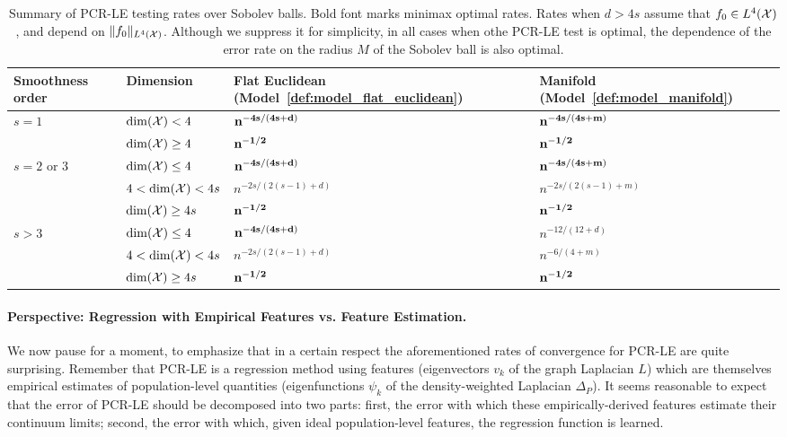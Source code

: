 \begin{table}
	\begin{center}
		\begin{tabular}{p{} p{} | p{} p{} }
			Smoothness order & Dimension & Flat Euclidean (Model~\ref{def:model_flat_euclidean}) & Manifold (Model~\ref{def:model_manifold}) \\
			\hline
			\multirow{2}{*}{$s = 1$} & $\dim(\mathcal{X}) < 4$ & ${\bf n^{-4s/(4s + d)}}$ & ${\bf n^{-4s/(4s + m)}}$ \\
			& $\dim(\mathcal{X}) \geq 4$ & ${\bf n^{-1/2}}$ & ${\bf n^{-1/2}}$ \\
			\hline
			\multirow{3}{*}{$s = 2$ or $3$} & $\dim(\mathcal{X}) \leq 4$  & ${\bf n^{-4s/(4s + d)}}$ & ${\bf n^{-4s/(4s + m)}}$ \\
			& $4 <\dim(\mathcal{X}) < 4s$  & $n^{-2s/(2(s - 1) + d)}$ & $n^{-2s/(2(s - 1) + m)}$\\
			& $\dim(\mathcal{X}) \geq 4s$ & ${\bf n^{-1/2}}$ & ${\bf n^{-1/2}}$ \\
			\hline
			\multirow{3}{*}{$s > 3$} & $\dim(\mathcal{X}) \leq 4$ & ${\bf n^{-4s/(4s + d)}}$ & $n^{-12/(12 + d)}$ \\
			& $4 < \dim(\mathcal{X}) < 4s$ & $n^{-2s/(2(s - 1) + d)}$ & $n^{-6/(4 + m)}$ \\
			& $\dim(\mathcal{X}) \geq 4s$ & ${\bf n^{-1/2}}$ & ${\bf n^{-1/2}}$ \\
		\end{tabular}
	\end{center}
	\caption{Summary of PCR-LE testing rates over Sobolev balls. Bold font marks minimax optimal rates. Rates when $d > 4s$ assume that $f_0 \in L^4(\mathcal{X})$, and depend on $\|f_0\|_{L^4(\mathcal{X})}$. Although we suppress it for simplicity, in all cases when othe PCR-LE test is optimal, the dependence of the error rate on the radius $M$ of the Sobolev ball is also optimal.}
	\label{tbl:testing_rates}
\end{table}

\paragraph{Perspective: Regression with Empirical Features vs. Feature Estimation.}
We now pause for a moment, to emphasize that in a certain respect the aforementioned rates of convergence for PCR-LE are quite surprising. Remember that PCR-LE is a regression method using features (eigenvectors $v_k$ of the graph Laplacian $L$) which are themselves empirical estimates of population-level quantities (eigenfunctions $\psi_k$ of the density-weighted Laplacian $\Delta_P$). It seems reasonable to expect that the error of PCR-LE should be decomposed into two parts: first, the error with which these empirically-derived features estimate their continuum limits; second, the error with which, given ideal population-level features, the regression function is learned.

